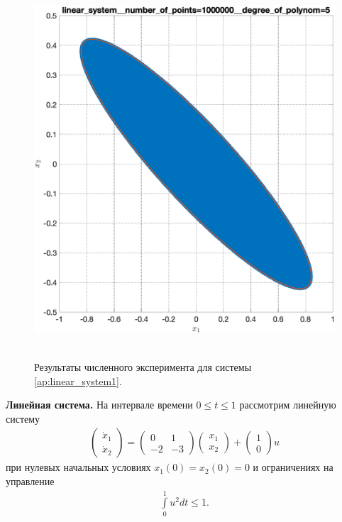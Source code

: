 \documentclass[../main.tex]{subfiles}
\begin{document}
\begin{figure}[ht!]
\begin{minipage}[b]{.3\linewidth}
  		\includegraphics[width=\linewidth]{images/linear_system__number_of_points=1000000__degree_of_polynom=5.eps}
  	\end{minipage} 
  	\caption{Результаты численного эксперимента для системы \eqref{ap:linear_system1}.}\label{fig:ap:rs_linear1}
  \end{figure}
  \textbf{Линейная система.} На интервале времени $ 0 \leqslant t \leqslant 1$ рассмотрим линейную систему 
  \begin{gather}\label{ap:linear_system1}
  	\begin{pmatrix} 
  		\dot{x}_1 \\
  		\dot{x}_2  
  	\end{pmatrix} = 
  	\begin{pmatrix}
  		0 & 1 \\
  		-2 & -3
  	\end{pmatrix}
  	\begin{pmatrix} 
  		x_1 \\
  		x_2  
  	\end{pmatrix} +
  	\begin{pmatrix} 1 \\ 0
  	\end{pmatrix} u
  \end{gather}
  при нулевых начальных условиях $x_1(0) = x_2(0) = 0 $ и ограничениях на управление 
  \begin{gather*}
  	\int\limits_0^1 u^2dt \leqslant 1.
  \end{gather*}
  
\end{document}
